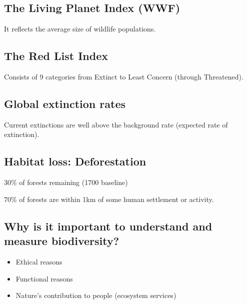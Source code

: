 \subsection{The Living Planet Index (WWF)}

It reflects the average size of wildlife populations.

\subsection{The Red List Index}

Consists of 9 categories from Extinct to Least Concern (through Threatened).

\subsection{Global extinction rates}

Current extinctions are well above the background rate (expected rate of
extinction).

\subsection{Habitat loss: Deforestation}

30\% of forests remaining (1700 baseline)

70\% of forests are within 1km of some human settlement or activity.

\subsection{Why is it important to understand and measure biodiversity?}
\begin{itemize}
	\item Ethical reasons
	\item Functional reasons
	\item Nature's contribution to people (ecosystem services)
\end{itemize}
